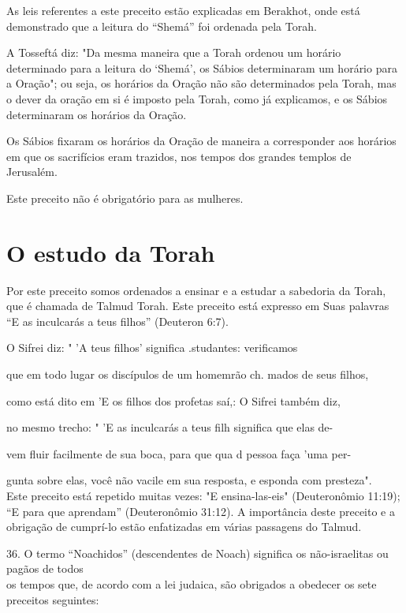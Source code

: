 As leis referentes a este preceito estão explicadas em Berakhot, on­de
está demonstrado que a leitura do ``Shemá'' foi ordenada pela Torah.

A Tosseftá diz: "Da mesma maneira que a Torah ordenou um horá­rio
determinado para a leitura do `Shemá', os Sábios determinaram um horário
para a Oração"; ou seja, os horários da Oração não são determinados pela
To­rah, mas o dever da oração em si é imposto pela Torah, como já
explicamos, e os Sábios determinaram os horários da Oração.

Os Sábios fixaram os horários da Oração de maneira a corresponder aos
horários em que os sacrifícios eram trazidos, nos tempos dos grandes
tem­plos de Jerusalém.

Este preceito não é obrigatório para as mulheres.

\section{O estudo da Torah}

Por este preceito somos ordenados a ensinar e a estudar a sabedoria da
Torah, que é chamada de Talmud Torah. Este preceito está expresso em
Suas palavras ``E as inculcarás a teus filhos'' (Deuteron 6:7).

O Sifrei diz: " 'A teus filhos' significa .studantes: verificamos


que em todo lugar os discípulos de um homemrão ch. mados de seus filhos,


como está dito em 'E os filhos dos profetas saí,: O Sifrei também diz,

no mesmo trecho: " 'E as inculcarás a teus filh significa que elas de-

vem fluir facilmente de sua boca, para que qua d pessoa faça 'uma per-


gunta sobre elas, você não vacile em sua resposta, e esponda com
presteza".\\
Este preceito está repetido muitas vezes: "E ensina-las-eis"
(Deuteronômio
11:19); ``E para que aprendam'' (Deuteronômio 31:12). A importância
deste preceito
e a obrigação de cumprí-lo estão enfatizadas em várias passagens
do Talmud.

36. O termo ``Noachidos'' (descendentes de Noach) significa os
não-israelitas ou pagãos de todos\\
os tempos que, de acordo com a lei judaica, são obrigados a obedecer os
sete preceitos seguintes:

